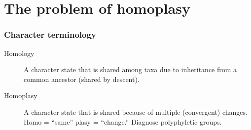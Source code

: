        

\section{The problem of homoplasy}

\begin{frame}
    \frametitle{Character terminology}
    \begin{description}
        \item[Homology] A character state that is shared among taxa due to
            inheritance from a common ancestor (shared by descent).
        \item[Homoplasy] A character state that is shared because of multiple
            (convergent) changes. Homo = ``same'' plasy = ``change.'' Diagnose
            polyphyletic groups.
    \end{description}
\end{frame}

